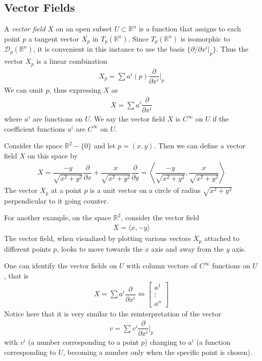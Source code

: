 \documentclass{article}
\newcommand{\R}{\mathbb{R}}
\newcommand{\Cinfty}{C^{\infty}}
\begin{document}
	\subsection*{Vector Fields}
	A \textit{vector field} $X$ on an open subset $U \subset \R^n$ is a function that assigns to each point $p$ a tangent vector $X_p$ in $T_p (\R^n)$. Since $T_p (\R^n)$ is isomorphic to $\mathcal{D}_p(\R^n)$, it is convenient in this instance to use the basis $\{ \partial / \partial x^i |_p \}$. Thus the vector $X_p$ is a linear combination
	\begin{gather*}
		X_p = \sum a^i(p) \dfrac{\partial}{\partial x^i} \Bigg|_p
	\end{gather*}
	We can omit $p$, thus expressing $X$ as
	\begin{gather*}
		X = \sum a^i \dfrac{\partial}{\partial x^i}
	\end{gather*}
	where $a^i$ are functions on $U$. We say the vector field $X$ is $\Cinfty$ on $U$ if the coefficient functions $a^i$ are $\Cinfty$ on $U$.

	Consider the space $\R^2 - \{0\}$ and let $p = (x, y)$. Then we can define a vector field $X$ on this space by
	\begin{gather*}
		X = \dfrac{-y}{\sqrt{x^2 + y^2}} \dfrac{\partial }{\partial x} + \dfrac{x}{\sqrt{x^2 + y^2}} \dfrac{\partial }{\partial y} = \left\langle \dfrac{-y}{\sqrt{x^2 + y^2}}, \dfrac{x}{\sqrt{x^2 + y^2}} \right\rangle
	\end{gather*}
	The vector $X_p$ at a point $p$ is a unit vector on a circle of radius $\sqrt{x^2 + y^2}$ perpendicular to it going counter. 
	
	For another example, on the space $\R^2$, consider the vector field
	\begin{gather*}
		X = \langle x, -y \rangle
	\end{gather*}
	The vector field, when visualized by plotting various vectors $X_p$ attached to different points $p$, looks to move towards the $x$ axis and away from the $y$ axis.
	
	One can identify the vector fields on $U$ with column vectors of $\Cinfty$ functions on $U$, that is
	\begin{gather*}
		X = \sum a^i \dfrac{\partial}{\partial x^i} \iff
		\begin{bmatrix}
			a^1 \\
			\vdots \\
			a^n
		\end{bmatrix}
	\end{gather*}
	Notice here that it is very similar to the reinterpretation of the vector
	\begin{gather*}
		v = \sum v^i \dfrac{\partial}{\partial x^i} \Bigg|_p
	\end{gather*}
	with $v^i$ (a number corresponding to a point $p$) changing to $a^i$ (a function corresponding to $U$, becoming a number only when the specific point is chosen).
	
\end{document}
